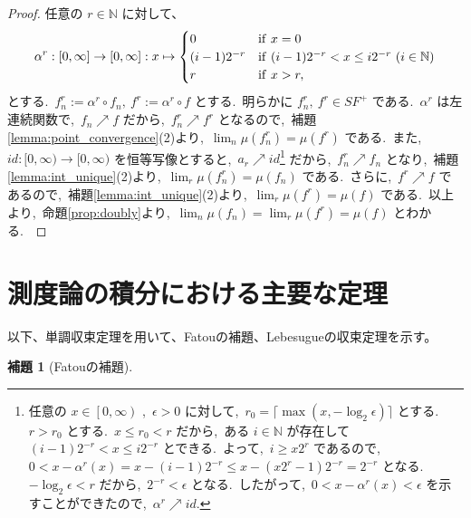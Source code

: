 \documentclass[a4j,11pt]{jarticle}
\theoremstyle{definition}
\newtheorem{lemma}[theorem]{補題}
\begin{document}
\begin{proof}
  任意の
  $r \in \mathbb{N}$
  に対して、
  \begin{equation}
    \alpha^r:\left[ 0,\infty\right] \to \left[ 0,\infty\right]:x\mapsto
    \begin{cases}
      0 & {\rm if}\ x=0 \\
      (i-1)2^{-r} & {\rm if}\ (i-1)2^{-r} < x \leq i2^{-r} \ (i\in\mathbb{N}) \\
      r & {\rm if} \ x > r,
    \end{cases}
  \end{equation}
  とする.\ 
  $f_n^r:=\alpha^r \circ f_n,\ f^r:=\alpha^r \circ f$
  とする.\ 
  明らかに
  $f_n^r,\ f^r \in SF^+$
  である.\ 
  $\alpha^r$
  は左連続関数で,\ 
  $f_n \nearrow f$
  だから,\ 
  $f_n^r \nearrow f^r$
  となるので,\ 補題\ref{lemma:point_convergence}(2)より,\ 
  $\lim_n \mu(f_n^r) = \mu(f^r)$
  である.\ 
  また,\ 
  $id:[0,\infty) \to [0,\infty)$
  を恒等写像とすると,\ 
  $a_r \nearrow id$\footnote{
    任意の
    $x\in \left[ 0, \infty \right)$
    ,\ 
    $\epsilon > 0$
    に対して,\ 
    $r_0 = \lceil \max(x, -\log_2 \epsilon) \rceil$
    とする.\ 
    $r > r_0$
    とする.\ 
    $x \leq r_0 < r$
    だから,\ ある
    $i \in \mathbb{N}$
    が存在して
    $(i-1)2^{-r} < x \leq i2^{-r}$
    とできる.\ 
    よって,\ 
    $i \geq x2^r$
    であるので,\ 
    $0 < x - \alpha^r(x) = x - (i-1)2^{-r} \leq x - (x2^r - 1)2^{-r} = 2^{-r}$
    となる.\ 
    $- \log_2 \epsilon < r$
    だから,\ 
    $2^{-r} < \epsilon$
    となる.\ 
    したがって,\ 
    $0 < x- \alpha^r(x) < \epsilon$
    を示すことができたので,\ 
    $\alpha^r \nearrow id$.
  }
  だから,\ 
  $f_n^r \nearrow f_n$
  となり,\ 補題\ref{lemma:int_unique}(2)より,\ 
  $\lim_r \mu(f_n^r) = \mu(f_n)$
  である.\ 
  さらに,\ 
  $f^r \nearrow f$
  であるので,\ 補題\ref{lemma:int_unique}(2)より,\ 
  $\lim_r \mu(f^r) = \mu(f)$
  である.\ 
  以上より,\ 命題\ref{prop:doubly}より,\ 
  $\lim_n \mu(f_n) = \lim_r \mu(f^r) = \mu(f)$
  とわかる.\ 
\end{proof}

\section*{測度論の積分における主要な定理}
以下、単調収束定理を用いて、Fatouの補題、Lebesugueの収束定理を示す。

\begin{lemma}[Fatouの補題]\label{lemma:Fatou}
\end{lemma}


%
%
\end{document}

